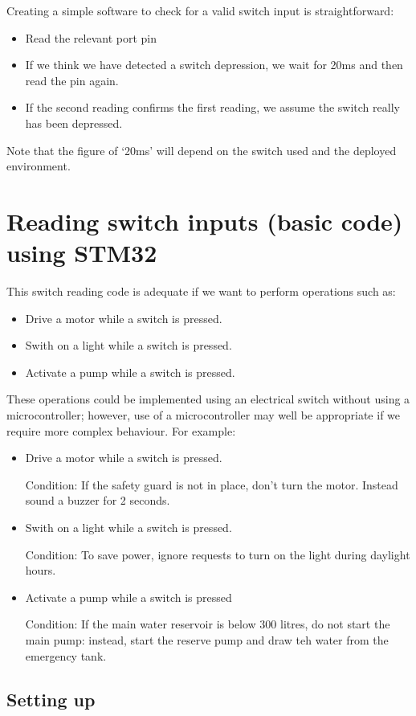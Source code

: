 Creating a simple software to check for a valid switch input is straightforward:
\begin{itemize}
    \item Read the relevant port pin
    \item If we think we have detected a switch depression, we wait for 20ms and then read the pin again.
    \item If the second reading confirms the first reading, we assume the switch really has been depressed.
\end{itemize}

Note that the figure of ‘20ms’ will depend on the switch used and the deployed environment. 

\section{Reading switch inputs (basic code) using STM32}
This switch reading code is adequate if we want to perform operations such as:
\begin{itemize}
    \item Drive a motor while a switch is pressed.
    \item Swith on a light while a switch is pressed.
    \item Activate a pump while a switch is pressed.
\end{itemize}
These operations could be implemented using an electrical switch without using a microcontroller; however, use of a microcontroller may well be appropriate if we require more complex behaviour. For example:
\begin{itemize}
    \item Drive a motor while a switch is pressed. 
    
    Condition: If the safety guard is not in place, don't turn the motor. Instead sound a buzzer for 2 seconds. 
    \item Swith on a light while a switch is pressed.
    
    Condition: To save power, ignore requests to turn on the light during daylight hours. 
    
    \item Activate a pump while a switch is pressed
    
    Condition: If the main water reservoir is below 300 litres, do not start the main pump: instead, start the reserve pump and draw teh water from the emergency tank. 
\end{itemize}
\subsection{Setting up}

